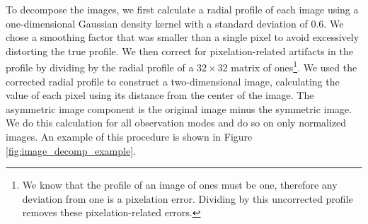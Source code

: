 \documentclass[twocolumn, linenumbers, 11pt]{aastex63}%
\begin{document}
To decompose the images, we first calculate a radial profile of each image using a one-dimensional Gaussian density kernel with a standard deviation of 0.6. We chose a smoothing factor that was smaller than a single pixel to avoid excessively distorting the true profile. We then correct for pixelation-related artifacts in the profile by dividing by the radial profile of a $32\times32$ matrix of ones\footnote{We know that the profile of an image of ones must be one, therefore any deviation from one is a pixelation error. Dividing by this uncorrected profile removes these pixelation-related errors.}. We used the corrected radial profile to construct a two-dimensional image, calculating the value of each pixel using its distance from the center of the image. The asymmetric image component is the original image minus the symmetric image. We do this calculation for all observation modes and do so on only normalized images. An example of this procedure is shown in Figure \ref{fig:image_decomp_example}.
\end{document}
